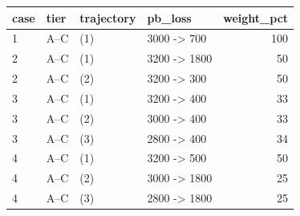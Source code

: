 \begin{tabular}{llllr}
\toprule
case & tier & trajectory & pb\_loss & weight\_pct \\
\midrule
1 & A--C & (1) & 3000 -> 700 & 100 \\
2 & A--C & (1) & 3200 -> 1800 & 50 \\
2 & A--C & (2) & 3200 -> 300 & 50 \\
3 & A--C & (1) & 3200 -> 400 & 33 \\
3 & A--C & (2) & 3000 -> 400 & 33 \\
3 & A--C & (3) & 2800 -> 400 & 34 \\
4 & A--C & (1) & 3200 -> 500 & 50 \\
4 & A--C & (2) & 3000 -> 1800 & 25 \\
4 & A--C & (3) & 2800 -> 1800 & 25 \\
\bottomrule
\end{tabular}
